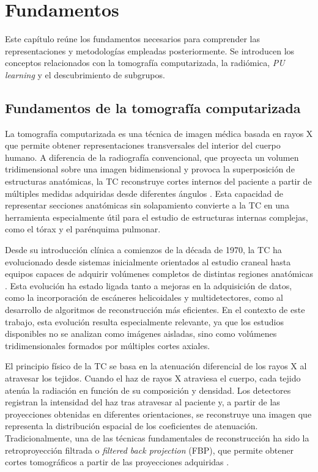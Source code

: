 
\chapter{Fundamentos}\label{chap:fundamentos}
Este capítulo reúne los fundamentos necesarios para comprender las representaciones y metodologías empleadas posteriormente. Se introducen los conceptos relacionados con la tomografía computarizada, la radiómica, \textit{PU learning} y el descubrimiento de subgrupos.


\section{Fundamentos de la tomografía computarizada}\label{sec:fundamentos_TC}

La tomografía computarizada es una técnica de imagen médica basada en rayos X que permite obtener representaciones transversales del interior del cuerpo humano. A diferencia de la radiografía convencional, que proyecta un volumen tridimensional sobre una imagen bidimensional y provoca la superposición de estructuras anatómicas, la TC reconstruye cortes internos del paciente a partir de múltiples medidas adquiridas desde diferentes ángulos \cite{buzug2011computed}. Esta capacidad de representar secciones anatómicas sin solapamiento convierte a la TC en una herramienta especialmente útil para el estudio de estructuras internas complejas, como el tórax y el parénquima pulmonar.

Desde su introducción clínica a comienzos de la década de 1970, la TC ha evolucionado desde sistemas inicialmente orientados al estudio craneal hasta equipos capaces de adquirir volúmenes completos de distintas regiones anatómicas \cite{calzado2010tomografia,schulz2021ct}. Esta evolución ha estado ligada tanto a mejoras en la adquisición de datos, como la incorporación de escáneres helicoidales y multidetectores, como al desarrollo de algoritmos de reconstrucción más eficientes. En el contexto de este trabajo, esta evolución resulta especialmente relevante, ya que los estudios disponibles no se analizan como imágenes aisladas, sino como volúmenes tridimensionales formados por múltiples cortes axiales.

El principio físico de la TC se basa en la atenuación diferencial de los rayos X al atravesar los tejidos. Cuando el haz de rayos X atraviesa el cuerpo, cada tejido atenúa la radiación en función de su composición y densidad. Los detectores registran la intensidad del haz tras atravesar al paciente y, a partir de las proyecciones obtenidas en diferentes orientaciones, se reconstruye una imagen que representa la distribución espacial de los coeficientes de atenuación. Tradicionalmente, una de las técnicas fundamentales de reconstrucción ha sido la retroproyección filtrada o \textit{filtered back projection} (FBP), que permite obtener cortes tomográficos a partir de las proyecciones adquiridas \cite{schofield2020image}.


